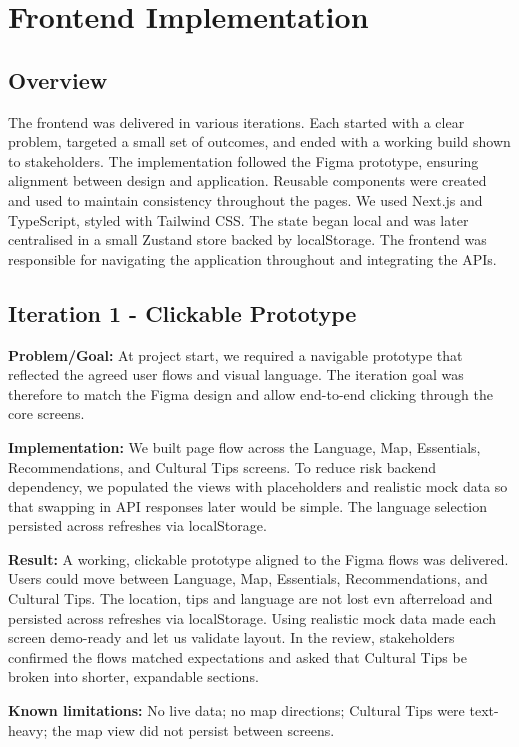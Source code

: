 \section{Frontend Implementation}

\subsection{Overview}
The frontend was delivered in various iterations. Each started with a clear problem, targeted a small set of outcomes, and ended with a working build shown to stakeholders. The implementation followed the Figma prototype, ensuring alignment between design and application. Reusable components were created and used to maintain consistency throughout the pages. We used Next.js and TypeScript, styled with Tailwind CSS. The state began local and was later centralised in a small Zustand store backed by localStorage. The frontend was responsible for navigating the application throughout and integrating the APIs.

\subsection{Iteration 1 - Clickable Prototype}
\textbf{Problem/Goal:} At project start, we required a navigable prototype that reflected the agreed user flows and visual language. The iteration goal was therefore to match the Figma design and allow end-to-end clicking through the core screens. 

\textbf{Implementation:} We built page flow across the Language, Map, Essentials, Recommendations, and Cultural Tips screens. To reduce risk backend dependency, we populated the views with placeholders and realistic mock data so that swapping in API responses later would be simple. The language selection persisted across refreshes via localStorage.

\textbf{Result:} A working, clickable prototype aligned to the Figma flows was delivered. Users could move between Language, Map, Essentials, Recommendations, and Cultural Tips. The location, tips and language are not lost evn afterreload and  persisted across refreshes via localStorage. Using realistic mock data made each screen demo-ready and let us validate layout. In the review, stakeholders confirmed the flows matched expectations and asked that Cultural Tips be broken into shorter, expandable sections.

\textbf{Known limitations:} No live data; no map directions; Cultural Tips were text-heavy; the map view did not persist between screens.

